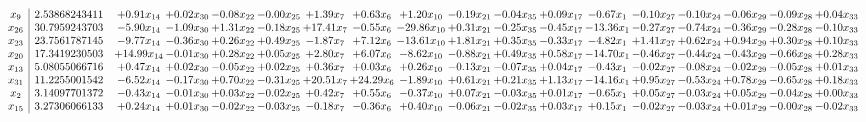 \documentclass[9pt]{article}
\begin{document}
 \[\begin{array}{c| c c@{\hskip 2pt} c@{\hskip 2pt} c@{\hskip 2pt} c@{\hskip 2pt} c@{\hskip 2pt} c@{\hskip 2pt} c@{\hskip 2pt} c@{\hskip 2pt} c@{\hskip 2pt} c@{\hskip 2pt} c@{\hskip 2pt} c@{\hskip 2pt} c@{\hskip 2pt} c@{\hskip 2pt} c@{\hskip 2pt} c@{\hskip 2pt} }
 x_{9}   &  2.53868243411 & +  0.91 x_{14} & +  0.02 x_{30} & -0.08 x_{22} & -0.00 x_{25} & +  1.39 x_{7} & +  0.63 x_{6} & +  1.20 x_{10} & -0.19 x_{21} & -0.04 x_{35} & +  0.09 x_{17} & -0.67 x_{1} & -0.10 x_{27} & -0.10 x_{24} & -0.06 x_{29} & -0.09 x_{28} & +  0.04 x_{33}\\
 x_{26}   &  30.7959243703 & -5.90 x_{14} & -1.09 x_{30} & +  1.31 x_{22} & -0.18 x_{25} & + 17.41 x_{7} & -0.55 x_{6} & -29.86 x_{10} & +  0.31 x_{21} & -0.25 x_{35} & -0.45 x_{17} & -13.36 x_{1} & -0.27 x_{27} & -0.74 x_{24} & -0.36 x_{29} & -0.28 x_{28} & -0.10 x_{33}\\
 x_{23}   &  23.7561787145 & -9.77 x_{14} & -0.36 x_{30} & +  0.26 x_{22} & +  0.49 x_{25} & -1.87 x_{7} & +  7.12 x_{6} & -13.61 x_{10} & +  1.81 x_{21} & +  0.35 x_{35} & -0.33 x_{17} & -4.82 x_{1} & +  1.41 x_{27} & +  0.62 x_{24} & +  0.94 x_{29} & +  0.30 x_{28} & +  0.10 x_{33}\\
 x_{20}   &  17.3419230503 & + 14.99 x_{14} & -0.01 x_{30} & +  0.28 x_{22} & +  0.05 x_{25} & +  2.80 x_{7} & +  6.07 x_{6} & -8.62 x_{10} & -0.88 x_{21} & +  0.49 x_{35} & +  0.58 x_{17} & -14.70 x_{1} & -0.46 x_{27} & -0.44 x_{24} & -0.43 x_{29} & -0.66 x_{28} & +  0.28 x_{33}\\
 x_{13}   &  5.08055066716 & +  0.47 x_{14} & +  0.02 x_{30} & -0.05 x_{22} & +  0.02 x_{25} & +  0.36 x_{7} & +  0.03 x_{6} & +  0.26 x_{10} & -0.13 x_{21} & -0.07 x_{35} & +  0.04 x_{17} & -0.43 x_{1} & -0.02 x_{27} & -0.08 x_{24} & -0.02 x_{29} & -0.05 x_{28} & +  0.01 x_{33}\\
 x_{31}   &  11.2255001542 & -6.52 x_{14} & -0.17 x_{30} & +  0.70 x_{22} & -0.31 x_{25} & + 20.51 x_{7} & + 24.29 x_{6} & -1.89 x_{10} & +  0.61 x_{21} & +  0.21 x_{35} & +  1.13 x_{17} & -14.16 x_{1} & +  0.95 x_{27} & -0.53 x_{24} & +  0.78 x_{29} & -0.65 x_{28} & +  0.18 x_{33}\\
 x_{2}   &  3.14097701372 & -0.43 x_{14} & -0.01 x_{30} & +  0.03 x_{22} & -0.02 x_{25} & +  0.42 x_{7} & +  0.55 x_{6} & -0.37 x_{10} & +  0.07 x_{21} & -0.03 x_{35} & +  0.01 x_{17} & -0.65 x_{1} & +  0.05 x_{27} & -0.03 x_{24} & +  0.05 x_{29} & -0.04 x_{28} & +  0.00 x_{33}\\
 x_{15}   &  3.27306066133 & +  0.24 x_{14} & +  0.01 x_{30} & -0.02 x_{22} & -0.03 x_{25} & -0.18 x_{7} & -0.36 x_{6} & +  0.40 x_{10} & -0.06 x_{21} & -0.02 x_{35} & +  0.03 x_{17} & +  0.15 x_{1} & -0.02 x_{27} & -0.03 x_{24} & +  0.01 x_{29} & -0.00 x_{28} & -0.02 x_{33}\\

\end{array}\]
\end{document}
